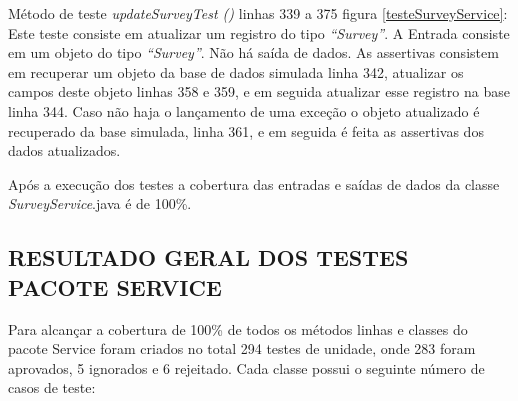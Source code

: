 Método de teste \textit{ updateSurveyTest ()} linhas 339 a 375 figura \ref{testeSurveyService}: Este teste consiste em atualizar um registro do tipo \textit{“Survey”}. A Entrada consiste em um objeto do tipo \textit{“Survey”}. Não há saída de dados. As assertivas consistem em recuperar um objeto da base de dados simulada linha 342, atualizar os campos deste objeto linhas 358 e 359, e em seguida atualizar esse registro na base linha 344. Caso não haja o lançamento de uma exceção o objeto atualizado é recuperado da base simulada, linha 361, e em seguida é feita as assertivas dos dados atualizados.

Após a execução dos testes a cobertura das entradas e saídas de dados da classe \textit{SurveyService}.java é de 100\%.



\subsection{RESULTADO GERAL DOS TESTES PACOTE SERVICE}

Para alcançar a cobertura de 100\% de todos os métodos linhas e classes do pacote Service foram criados no total 294 testes de unidade, onde 283 foram aprovados, 5 ignorados e 6 rejeitado. Cada classe possui o seguinte número de casos de teste: 

